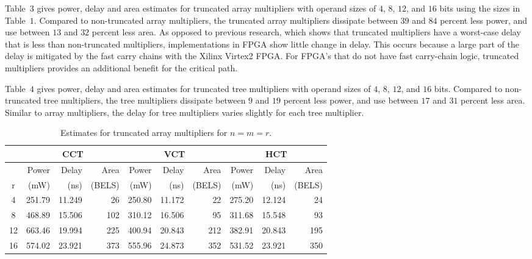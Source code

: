 Table~$3$ gives power, delay and area estimates 
for truncated array multipliers with operand sizes of 
$4$, $8$, $12$, and $16$ bits using the sizes in Table~$1$. 
Compared to 
non-truncated array multipliers, the truncated array multipliers
dissipate between $39$ and $84$ percent less power, and use
between $13$ and $32$ percent less area. As opposed to previous research,
which shows that truncated multipliers have a worst-case delay that
is less than non-truncated multipliers, implementations in FPGA show
little change in delay.  This occurs because a large part of the delay
is mitigated by the fast carry chains with the Xilinx Virtex2 FPGA.  For
FPGA's that do not have fast carry-chain logic, truncated multipliers
provides an additional benefit for the critical path.

Table~$4$ gives power, delay and area estimates 
for truncated tree multipliers with operand sizes of 
$4$, $8$, $12$, and $16$ bits. 
Compared to non-truncated
tree multipliers, the tree multipliers
dissipate between $9$ and $19$ percent less power, and use
between $17$ and $31$ percent less area. Similar to array multipliers, the
delay for tree multipliers varies slightly for each tree multiplier.
\begin{table*}
\centering
\label{tarray1.tbl}
\begin{tabular}{|c|r|r|r||r|r|r||r|r|r||} \hline
\multicolumn{1}{|c|}{} & \multicolumn{3}{|c||}{CCT} &
\multicolumn{3}{|c||}{VCT} &  \multicolumn{3}{|c||}{HCT} \\ \hline
   & Power & Delay & Area & Power & Delay & Area &
Power & Delay & Area \\ 
r  & (mW) & (ns) & (BELS) & (mW) & (ns) & (BELS) &
(mW) & (ns) & (BELS) \\ \hline \hline
4  & 251.79 & 11.249 &  26 & 250.80 & 11.172 & 22  &
 275.20 & 12.124 &  24 \\ \hline 
8  & 468.89 & 15.506 & 102 & 310.12 & 16.506 & 95  &
 311.68 & 15.548 & 93 \\ \hline 
12 & 663.46 & 19.994 & 225 & 400.94 & 20.843 & 212 &
382.91 & 20.843 & 195 \\ \hline 
16 & 574.02 & 23.921 & 373 & 555.96 & 24.873 & 352 &
531.52 & 23.921 & 350 \\ \hline 
\end{tabular}
\caption{Estimates for truncated array multipliers for $n=m=r$.}
\end{table*}
